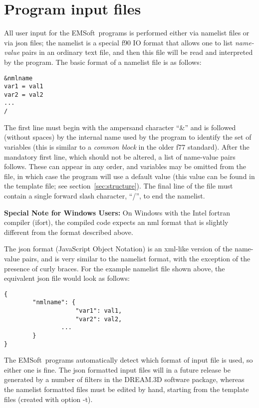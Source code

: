 \documentclass[DIV=calc, paper=letter, fontsize=11pt]{scrartcl}	 %
\newcommand{\ctp}{\textsf{EMSoft}}
\begin{document}
\newpage
\section{Program input files\label{sec:f90input}}
All user input for the \ctp\ programs is performed either via namelist files or via json files; the namelist is a special f90 IO format that allows one to list 
\textit{name-value} pairs in an ordinary text file, and then this file will be read and interpreted by the 
program.  The basic format of a namelist file is as follows:
\begin{verbatim}
&nmlname
var1 = val1
var2 = val2
...
/
\end{verbatim}
The first line must begin with the ampersand character ``\&'' and is followed (without spaces) by the internal name used by the program 
to identify the set of variables (this is similar to a \textit{common block} in the older f77 standard).  After the mandatory first line, which should not be altered, a 
list of name-value pairs follows.  These can appear in any order, and variables may be omitted from the file, in which case the program
will use a default value (this value can be found in the template file; see section~\ref{sec:structure}).  The final line of the file must contain a single forward slash
character, ``/'', to end the namelist.

{\color{blue}\textbf{Special Note for Windows Users:} On Windows with the Intel fortran compiler (ifort), the compiled code expects an nml format that is slightly different from the format described above.
}

The json format (JavaScript Object Notation) is an xml-like version of the name-value pairs, and is very similar to the namelist format, with the exception 
of the presence of curly braces.  For the example namelist file shown above, the equivalent json file would look as follows:
\begin{verbatim}
{
        "nmlname": {
        	        "var1": val1,
        	        "var2": val2,
                ...		
        }
}
\end{verbatim}
The \ctp\ programs automatically detect which format of input file is used, so either one is fine.  The json formatted input files 
will in a future release be generated by a number of filters in the \textsf{DREAM.3D} software package, whereas the namelist formatted 
files must be edited by hand, starting from the template files (created with option -t).\\
\end{document}
